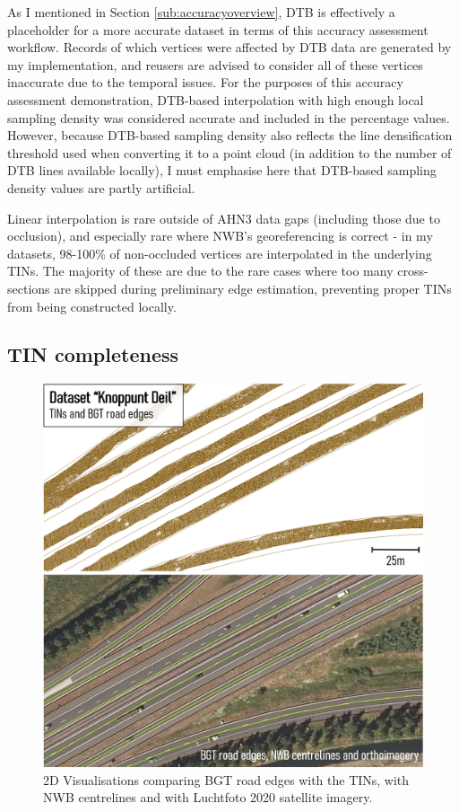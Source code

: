 As I mentioned in Section \ref{sub:accuracyoverview}, DTB is effectively a placeholder for a more accurate dataset in terms of this accuracy assessment workflow. Records of which vertices were affected by DTB data are generated by my implementation, and reusers are advised to consider all of these vertices inaccurate due to the temporal issues. For the purposes of this accuracy assessment demonstration, DTB-based interpolation with high enough local sampling density was considered accurate and included in the percentage values. However, because DTB-based sampling density also reflects the line densification threshold used when converting it to a point cloud (in addition to the number of DTB lines available locally), I must emphasise here that DTB-based sampling density values are partly artificial.

Linear interpolation is rare outside of AHN3 data gaps (including those due to occlusion), and especially rare where NWB's georeferencing is correct - in my datasets, 98-100\% of non-occluded vertices are interpolated in the underlying TINs. The majority of these are due to the rare cases where too many cross-sections are skipped during preliminary edge estimation, preventing proper TINs from being constructed locally.

\subsection{TIN completeness}
\label{sub:tincompleteness}

\begin{figure}
    \centering
    \includegraphics[width=\linewidth]{final_report/figs/bgtcomparison.png}
    \caption{2D Visualisations comparing BGT road edges with the TINs, with NWB centrelines and with Luchtfoto 2020 satellite imagery.}
    \label{fig:bgtcomparison}
\end{figure}

